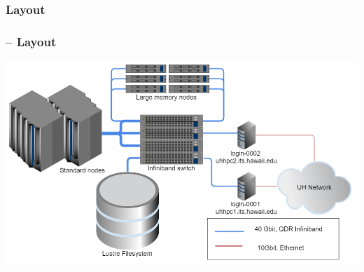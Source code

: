 \subsubsection{Layout}
\begin{frame}
	\frametitle{{\craycs} -- Layout}
	\includegraphics[width=1\textwidth]{images/layout}
\end{frame}


